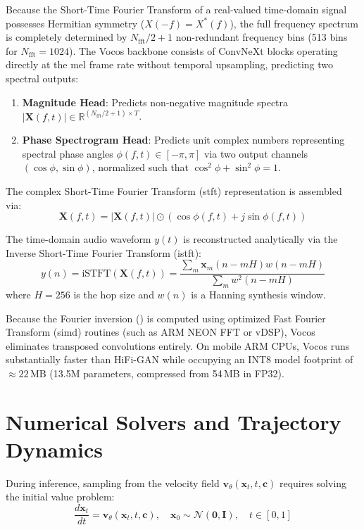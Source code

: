Because the Short-Time Fourier Transform of a real-valued time-domain signal possesses Hermitian symmetry ($X(-f) = X^*(f)$), the full frequency spectrum is completely determined by $N_{\text{fft}}/2 + 1$ non-redundant frequency bins (513 bins for $N_{\text{fft}} = 1024$). The Vocos backbone consists of ConvNeXt blocks operating directly at the mel frame rate without temporal upsampling, predicting two spectral outputs:
\begin{enumerate}
    \item \textbf{Magnitude Head}: Predicts non-negative magnitude spectra $|\mathbf{X}(f, t)| \in \mathbb{R}^{(N_{\text{fft}}/2 + 1) \times T}$.
    \item \textbf{Phase Spectrogram Head}: Predicts unit complex numbers representing spectral phase angles $\phi(f, t) \in [-\pi, \pi]$ via two output channels $(\cos \phi, \sin \phi)$, normalized such that $\cos^2 \phi + \sin^2 \phi = 1$.
\end{enumerate}

The complex Short-Time Fourier Transform (\acrshort{stft}) representation is assembled via:
\begin{equation}
    \mathbf{X}(f, t) = |\mathbf{X}(f, t)| \odot \left( \cos \phi(f, t) + j \sin \phi(f, t) \right)
    \label{eq:complex_stft}
\end{equation}

The time-domain audio waveform $y(t)$ is reconstructed analytically via the Inverse Short-Time Fourier Transform (\acrshort{istft}):
\begin{equation}
    y(n) = \text{iSTFT}(\mathbf{X}(f, t)) = \frac{\sum_m \mathbf{x}_m(n - mH) w(n - mH)}{\sum_m w^2(n - mH)}
    \label{eq:istft_synthesis}
\end{equation}
where $H = 256$ is the hop size and $w(n)$ is a Hanning synthesis window.

Because the Fourier inversion () is computed using optimized Fast Fourier Transform (\acrshort{simd}) routines (such as ARM NEON FFT or vDSP), Vocos eliminates transposed convolutions entirely. On mobile ARM CPUs, Vocos runs substantially faster than HiFi-GAN while occupying an INT8 model footprint of $\approx 22$\,MB (13.5M parameters, compressed from 54\,MB in FP32).

\section{Numerical Solvers and Trajectory Dynamics}
During inference, sampling from the velocity field $\mathbf{v}_\theta(\mathbf{x}_t, t, \mathbf{c})$ requires solving the initial value problem:
\begin{equation}
    \frac{d\mathbf{x}_t}{dt} = \mathbf{v}_\theta(\mathbf{x}_t, t, \mathbf{c}), \quad \mathbf{x}_0 \sim \mathcal{N}(\mathbf{0}, \mathbf{I}), \quad t \in [0, 1]
    \label{eq:ode_sampling}
\end{equation}

